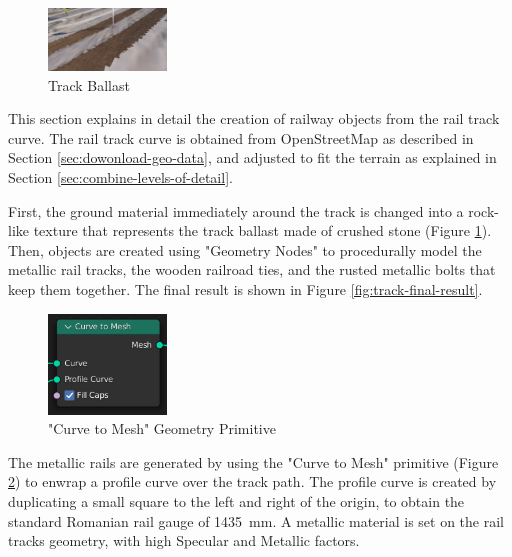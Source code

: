 \begin{figure}
    \centering
    \includegraphics[width=0.28\textwidth]{src/img/procedural-tracks/1-trackbed.png}
    \caption{Track Ballast}
    \label{fig:track-ballast-pic}
\end{figure}

This section explains in detail the creation of railway objects from the rail track curve. The rail track curve is obtained from OpenStreetMap as described in Section \ref{sec:dowonload-geo-data}, and adjusted to fit the terrain as explained in Section \ref{sec:combine-levels-of-detail}.


First, the ground material immediately around the track is changed into a rock-like texture that represents the track ballast made of crushed stone (Figure \ref{fig:track-ballast-pic}). Then, objects are created using "Geometry Nodes" to procedurally model the metallic rail tracks, the wooden railroad ties, and the rusted metallic bolts that keep them together. The final result is shown in Figure \ref{fig:track-final-result}.

\begin{figure}
    \centering
    \includegraphics[width=0.28\textwidth]{src/img/procedural-tracks/3a-rails-curve-to-mesh.png}
    \caption{"Curve to Mesh" Geometry Primitive}
    \label{fig:track-curve-to-mesh-primitive}
\end{figure}




The metallic rails are generated by using the "Curve to Mesh" primitive (Figure \ref{fig:track-curve-to-mesh-primitive}) to enwrap a profile curve over the track path. The profile curve is created by duplicating a small square to the left and right of the origin, to obtain the standard Romanian rail gauge of 1435 mm. A metallic material is set on the rail tracks geometry, with high Specular and Metallic factors.



